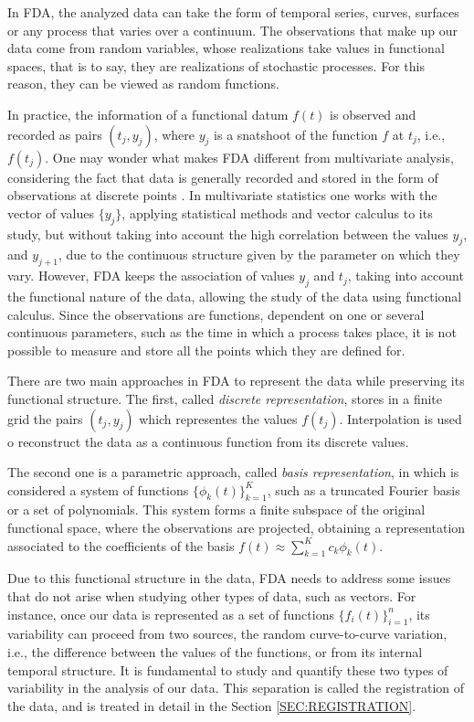 In \acs{FDA}, the analyzed data can take the form of temporal series, curves,
surfaces or any process that varies over a continuum. The observations that
make up our data come from random variables, whose realizations take
values in functional spaces, that is to say, they are realizations of
stochastic processes. For this reason, they can be viewed as random functions.

In practice, the information of a functional datum $f(t)$ is observed and
recorded as pairs $(t_j, y_j)$, where $y_j$ is a snatshoot of the
function $f$ at $t_j$, i.e., $f(t_j)$.
One may wonder what makes \acs{FDA} different from multivariate analysis, considering
the fact that data is generally recorded and stored in the form of
observations at discrete points \cite{Srivastava2016}.
In multivariate statistics one works with the vector of values $\{y_j\}$,
applying statistical methods and vector calculus to its study,
but without taking into account the high correlation between the values
$y_j$, and $y_{j+1}$, due to the continuous structure given by the parameter on
which they vary.
However, \acs{FDA} keeps the association of
values ${y_j}$ and ${t_j}$, taking into account the functional nature of the
data, allowing the study of the data using functional calculus.
Since the observations are functions, dependent on one or several continuous
parameters, such as the time in which a process takes place, it is not
possible to measure and store all the points which they are defined for.

There are two main approaches in \acs{FDA} to represent the data while preserving its
functional structure. The first, called \textit{discrete representation}, stores
in a finite grid the pairs $(t_j, y_j)$ which representes the values $f(t_j)$. Interpolation is used o reconstruct the data as a continuous function from its discrete values.

The second one is a parametric approach, called \textit{basis representation},
in which is considered a system of functions $\{\phi_k(t) \}_{k=1}^K$, such as a
truncated Fourier basis or a set of polynomials. This system forms a finite
subspace of the original functional space, where the
observations are projected, obtaining a representation associated to the
coefficients of the basis $f(t) \approx \sum_{k=1}^K c_k\phi_k(t)$.

Due to this functional structure in the data,
\acs{FDA} needs to address some issues that do not arise when studying other types of
data, such as vectors.
For instance, once our data is represented as a set of functions
$\{f_i(t)\}_{i=1}^{n}$, its variability can proceed from two sources,
the random curve-to-curve variation, i.e., the difference between the values of
the functions, or from its internal temporal structure.
It is fundamental to study and quantify these two types of variability in
the analysis of our data. This separation is called the registration of the data,
and is treated in detail in the Section \ref{SEC:REGISTRATION}.

